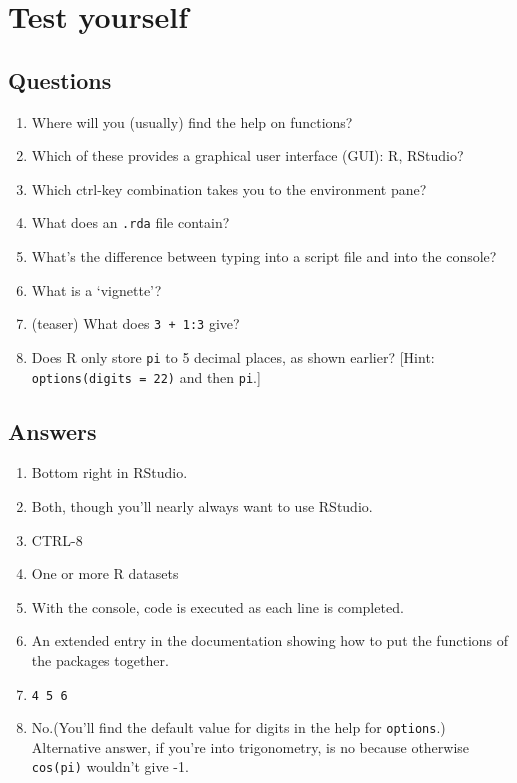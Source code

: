\documentclass[
]{book}
\providecommand{\tightlist}{%
  \setlength{\itemsep}{0pt}\setlength{\parskip}{0pt}}
\begin{document}
\hypertarget{test-yourself}{%
\section{Test yourself}\label{test-yourself}}

\hypertarget{questions}{%
\subsection{Questions}\label{questions}}

\begin{enumerate}
\def\labelenumi{\arabic{enumi}.}
\tightlist
\item
  Where will you (usually) find the help on functions?
\item
  Which of these provides a graphical user interface (GUI): R, RStudio?
\item
  Which ctrl-key combination takes you to the environment pane?
\item
  What does an \texttt{.rda} file contain?
\item
  What's the difference between typing into a script file and into the console?
\item
  What is a `vignette'?
\item
  (teaser) What does \texttt{3\ +\ 1:3} give?
\item
  Does R only store \texttt{pi} to 5 decimal places, as shown earlier? {[}Hint: \texttt{options(digits\ =\ 22)} and then \texttt{pi}.{]}
\end{enumerate}

\hypertarget{answers}{%
\subsection{Answers}\label{answers}}

\begin{enumerate}
\def\labelenumi{\arabic{enumi}.}
\tightlist
\item
  Bottom right in RStudio.
\item
  Both, though you'll nearly always want to use RStudio.
\item
  CTRL-8
\item
  One or more R datasets
\item
  With the console, code is executed as each line is completed.
\item
  An extended entry in the documentation showing how to put the functions of the packages together.
\item
  \texttt{4\ 5\ 6}
\item
  No.(You'll find the default value for digits in the help for \texttt{options}.) Alternative answer, if you're into trigonometry, is no because otherwise \texttt{cos(pi)} wouldn't give -1.
\end{enumerate}
\end{document}
